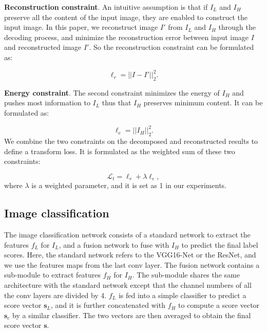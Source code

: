 \documentclass[letterpaper]{article} %
\begin{document}
\noindent\textbf{Reconstruction constraint}.
An intuitive assumption is that if $I_L$ and $I_H$ preserve all the content of the input image, they are enabled to construct the input image. In this paper, we reconstruct image $I'$ from $I_L$ and $I_H$ through the decoding process, and minimize the reconstruction error between input image $I$ and reconstructed image $I'$. So the reconstruction constraint can be formulated as:

\begin{equation}
   \ell_r=\vert\vert I-I' \vert\vert_2^2.
\end{equation}

\noindent\textbf{Energy constraint}.
The second constraint minimizes the energy of $I_H$ and pushes most information to $I_L$ thus that $I_H$ preserves minimum content. It can be formulated as:

\begin{equation}
   \ell_e=\vert\vert I_H \vert\vert_2^2.
\end{equation}
We combine the two constraints on the decomposed and reconstructed results to define a transform loss. It is formulated as the weighted sum of these two constraints:

\begin{equation}
   \mathcal{L}_t=\ell_r+\lambda\ell_e,
\end{equation}
where $\lambda$ is a weighted parameter, and it is set as 1 in our experiments.

\subsection{Image classification}
The image classification network consists of a standard network to extract the features $f_L$ for $I_L$, and a fusion network to fuse with $I_H$ to predict the final label scores. Here, the standard network refers to the VGG16-Net or the ResNet, and we use the features maps from the last conv layer. The fusion network contains a sub-module to extract features $f_H$ for $I_H$. The sub-module shares the same architecture with the standard network except that the channel numbers of all the conv layers are divided by 4. $f_L$ is fed into a simple classifier to predict a score vector $\mathbf{s}_L$, and it is further concatenated with $f_H$ to compute a score vector $\mathbf{s}_c$ by a similar classifier. The two vectors are then averaged to obtain the final score vector $\mathbf{s}$.
\end{document}
